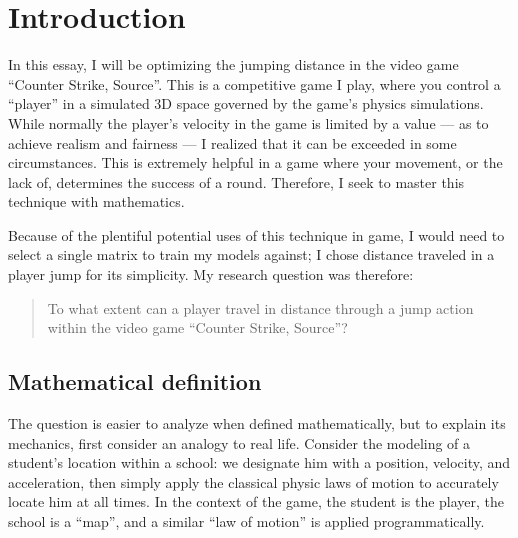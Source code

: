 \section{Introduction}


In this essay, I will be optimizing the jumping distance in the video game ``Counter Strike, Source''. This is a competitive game I play, where you control a ``player'' in a simulated 3D space governed by the game's physics simulations. While normally the player's velocity in the game is limited by a value --- as to achieve realism and fairness --- I realized that it can be exceeded in some circumstances. This is extremely helpful in a game where your movement, or the lack of, determines the success of a round. Therefore, I seek to master this technique with mathematics.


Because of the plentiful potential uses of this technique in game, I would need to select a single matrix to train my models against; I chose distance traveled in a player jump for its simplicity. My research question was therefore:
\begin{quote}
    To what extent can a player travel in distance through a jump action within the video game ``Counter Strike, Source''?
\end{quote}

\subsection{Mathematical definition}
The question is easier to analyze when defined mathematically, but to explain its mechanics, first consider an analogy to real life. Consider the modeling of a student's location within a school: we designate him with a position, velocity, and acceleration, then simply apply the classical physic laws of motion to accurately locate him at all times. In the context of the game, the student is the player, the school is a ``map'', and a similar ``law of motion'' is applied programmatically.


